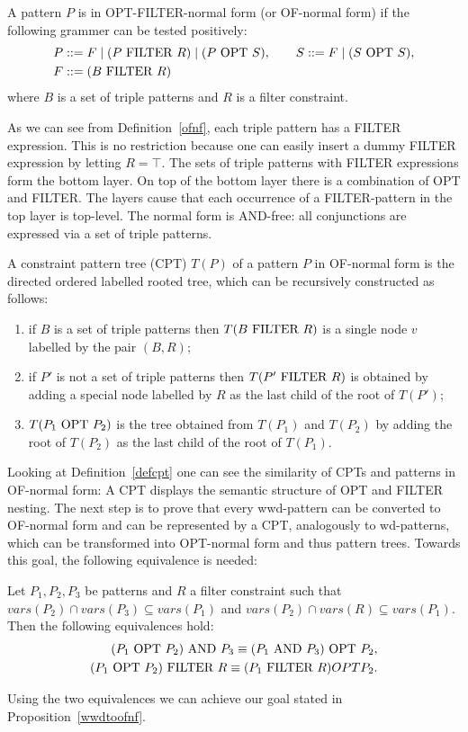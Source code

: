 \begin{definition}\label{ofnf}
	A pattern $P$ is in OPT-FILTER-normal form (or OF-normal form)
	if the following grammer can be tested positively:
	\begin{align*}
		&P ::=  F \mid (P \mbox{ FILTER } R) \mid (P \mbox{ OPT } S), \qquad S::= F\mid(S \mbox{ OPT } S),\\ 
	 &F ::=(B \mbox{ FILTER } R)
	\end{align*}
	where $B$ is a set of triple patterns and $R$ is a filter
	constraint.
\end{definition}
As we can see from Definition~\ref{ofnf}, each triple pattern has a FILTER expression. 
This is no restriction because one can easily insert a dummy FILTER expression 
by letting $R = \top$. The sets of triple patterns with FILTER expressions form the bottom layer.
On top of the bottom layer there is a combination of OPT and FILTER.
The layers cause that each occurrence of a FILTER-pattern in
the top layer is top-level. The normal form is AND-free: all conjunctions are
expressed via a set of triple patterns.

\begin{definition}\label{defcpt}
	A constraint pattern tree (CPT) $T(P)$ of a pattern $P$ in OF-normal form is
	the directed ordered labelled rooted tree, which can be recursively
	constructed as follows:
	\begin{enumerate}	
		\item if $B$ is a set of triple patterns then $T(B \mbox{ FILTER } R)$ is a single node
			$v$ labelled by the pair $(B,R)$;
		\item if $P'$ is not a set of triple patterns then $T(P' \mbox{ FILTER } R)$ is obtained
			by adding a special node labelled by $R$ as the last child of the
			root of $T(P')$;
		\item $T(P_1 \mbox{ OPT } P_2)$ is the tree obtained from $T(P_1)$ and $T(P_2)$
			by adding the root of $T(P_2)$ as the last child of the root of
			$T(P_1)$.
	\end{enumerate}
\end{definition}
Looking at Definition~\ref{defcpt} one can see the similarity of CPTs and
patterns in OF-normal form: A CPT displays the semantic structure of OPT and FILTER nesting.
The next step is to prove that every wwd-pattern can be converted to OF-normal
form and can be represented by a CPT, analogously to wd-patterns, which can be
transformed into  OPT-normal form and thus pattern trees. 
Towards this goal, the following equivalence is needed:
\begin{proposition}
	Let $P_1,P_2,P_3$ be patterns and $R$ a filter constraint such that
	$vars(P_2) \cap vars(P_3) \subseteq vars(P_1)$ and $vars(P_2) \cap vars(R)
	\subseteq vars(P_1)$. Then the following equivalences hold:
	\begin{align*}
		(P_1 \mbox{ OPT } P_2) \mbox{ AND } P_3 \equiv (P_1 \mbox{ AND } P_3) \mbox{ OPT } P_2,\\
		(P_1 \mbox{ OPT } P_2) \mbox{ FILTER } R \equiv (P_1 \mbox{ FILTER } R) OPT P_2.
	\end{align*}
\end{proposition}
Using the two equivalences we can achieve our goal stated in
Proposition~\ref{wwdtoofnf}.

